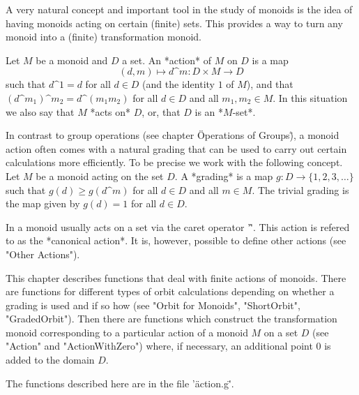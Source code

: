 %
%

A very natural concept and important tool in  the study of monoids is the
idea of having monoids acting on certain  (finite) sets.  This provides a
way to turn any monoid into a (finite) transformation monoid.

Let $M$ be a monoid and $D$ a set.  An *action* of $M$ on $D$ is a map
\[
  (d, m) \mapsto d\^m \colon D \times M \to D
\]
such that $d\^1 = d$ for all $d \in D$ (and the identity $1$ of $M$), and
that $(d\^{m_1})\^{m_2} = d\^{(m_1 m_2)}$ for all $d \in D$ and all $m_1,
m_2  \in M$.  In this  situation we also say that  $M$ *acts on* $D$, or,
that $D$ is an *$M$-set*.

In contrast to group operations (see chapter \"Operations of Groups\"), a
monoid action  often comes with a  natural grading  that  can be  used to
carry out  certain calculations more  efficiently.  To be precise we work
with the following concept.  Let  $M$ be a monoid  acting on the set $D$. 
A *grading* is a map $g \colon D \to \{1, 2,  3, \dots\}$ such that $g(d)
\geq g(d\^m)$ for all $d \in  D$ and all $m  \in M$.  The trivial grading
is the map given by $g(d) = 1$ for all $d \in D$.

In  {\GAP} a monoid usually  acts on a set via  the caret  operator '\^'. 
This action is  refered to  as the  *canonical action*.   It is, however,
possible to define other actions (see "Other Actions").

This chapter describes   functions  that deal   with finite  actions   of
monoids.  There  are functions for  different types of orbit calculations
depending on whether a  grading is  used and  if so  how (see "Orbit  for
Monoids", "ShortOrbit", "GradedOrbit").   Then there are functions  which
construct the transformation monoid corresponding  to a particular action
of a monoid $M$  on a set  $D$ (see "Action" and "ActionWithZero") where,
if necessary, an additional point $0$ is added to the domain $D$.

The functions described here are in the file '\"action.g\"'.

%
%
%
%
%
%
%
%

